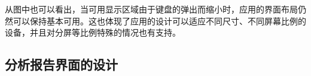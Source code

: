 \begin{figure}[ht]
    \centering
    \label{fig:history-time-picker}
\end{figure}

从图中也可以看出，当可用显示区域由于键盘的弹出而缩小时，应用的界面布局仍然可以保持基本可用。这也体现了应用的设计可以适应不同尺寸、不同屏幕比例的设备，并且对分屏等比例特殊的情况也有支持。

\subsection{分析报告界面的设计}\label{subsec:analytics-design}


